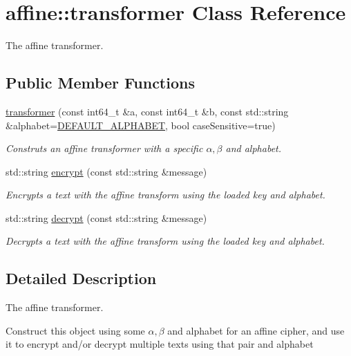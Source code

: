 \hypertarget{classaffine_1_1transformer}{}\section{affine\+:\+:transformer Class Reference}
\label{classaffine_1_1transformer}


The affine transformer.  


\subsection*{Public Member Functions}
\begin{DoxyCompactItemize}
\item 
\hyperlink{classaffine_1_1transformer_a6f04f1103f166c97c6a11fb97c891d34}{transformer} (const int64\+\_\+t \&a, const int64\+\_\+t \&b, const std\+::string \&alphabet=\hyperlink{namespaceaffine_affbde77969645d73c99952c7f3259b83}{D\+E\+F\+A\+U\+L\+T\+\_\+\+A\+L\+P\+H\+A\+B\+ET}, bool case\+Sensitive=true)
\begin{DoxyCompactList}\small\item\em Construts an affine transformer with a specific $ \alpha, \beta $ and alphabet. \end{DoxyCompactList}\item 
std\+::string \hyperlink{classaffine_1_1transformer_ad28f9eef120bf302ac0d191b7c2480f7}{encrypt} (const std\+::string \&message)
\begin{DoxyCompactList}\small\item\em Encrypts a text with the affine transform using the loaded key and alphabet. \end{DoxyCompactList}\item 
std\+::string \hyperlink{classaffine_1_1transformer_a7e977925e3182cc82e95ec3e2313e207}{decrypt} (const std\+::string \&message)
\begin{DoxyCompactList}\small\item\em Decrypts a text with the affine transform using the loaded key and alphabet. \end{DoxyCompactList}\end{DoxyCompactItemize}


\subsection{Detailed Description}
The affine transformer. 

Construct this object using some $ \alpha, \beta $ and alphabet for an affine cipher, and use it to encrypt and/or decrypt multiple texts using that pair and alphabet 

